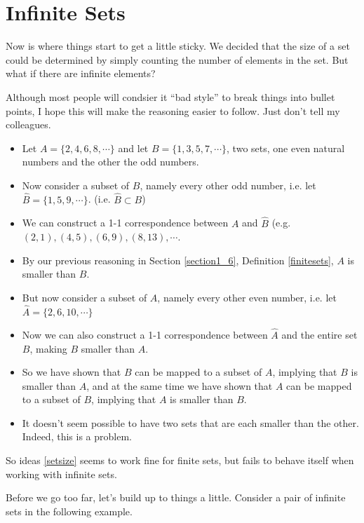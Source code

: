 \section{Infinite Sets}

Now is where things start to get a little sticky.  We decided that the size of a set could be determined by simply counting the number of elements in the set.  But what if there are infinite elements?
\begin{example} Although most people will condsier it ``bad style'' to break things into bullet points, I hope this will make the reasoning easier to follow.  Just don't tell my colleagues. 
\begin{itemize}
\item Let $A = \{2, 4, 6, 8, \cdots \}$ and let $B = \{1, 3, 5, 7, \cdots\}$, two sets, one even natural numbers and the other the odd numbers. 
\item Now consider a subset of $B$, namely every other odd number, i.e. let $\hat{B} = \{1, 5, 9, \cdots  \}$.   (i.e. $\hat{B}\subset B$)
\item We can construct a 1-1 correspondence between $A$ and $\hat B$ (e.g. $(2, 1), (4, 5), (6, 9), (8, 13),\cdots$. 
\item  By our previous reasoning in Section \ref{section1_6}, Definition \ref{finitesets}, $A$ is smaller than $B$.  
\item But now consider a subset of $A$, namely every other even number, i.e. let $\hat{A} = \{2, 6, 10, \cdots  \}$
\item  Now we can also construct a 1-1 correspondence between $\hat A$ and the entire set $B$, making $B$ smaller than $A$.  
\item  So we have shown that $B$ can be mapped to a subset of $A$, implying that $B$ is smaller than $A$, and at the same time we have shown that $A$ can be mapped to a subset of $B$, implying that $A$ is smaller than $B$.
\item It doesn't seem possible to have two sets that are each smaller than the other.  Indeed, this is a problem.
\end{itemize}
\end{example}

So ideas \ref{setsize} seems to work fine for finite sets, but fails to behave itself when working with infinite sets.

Before we go too far, let's build up to things a little.  Consider a pair of infinite sets in the following example.

